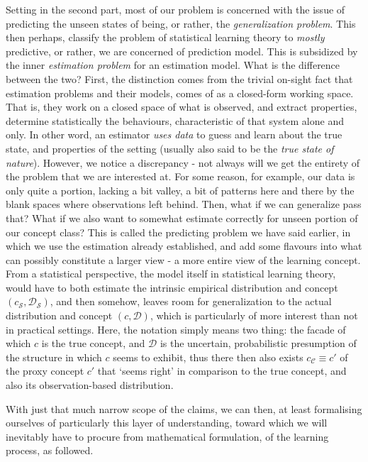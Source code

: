 Setting in the second part, most of our problem is concerned with the issue of predicting the unseen states of being, or rather, the \textit{generalization problem}. This then perhaps, classify the problem of statistical learning theory to \textit{mostly} predictive, or rather, we are concerned of prediction model. This is subsidized by the inner \textit{estimation problem} for an estimation model. What is the difference between the two? First, the distinction comes from the trivial on-sight fact that estimation problems and their models, comes of as a closed-form working space. That is, they work on a closed space of what is observed, and extract properties, determine statistically the behaviours, characteristic of that system alone and only. In other word, an estimator \textit{uses data} to guess and learn about the true state, and properties of the setting (usually also said to be the \textit{true state of nature}). However, we notice a discrepancy - not always will we get the entirety of the problem that we are interested at. For some reason, for example, our data is only quite a portion, lacking a bit valley, a bit of patterns here and there by the blank spaces where observations left behind. Then, what if we can generalize pass that? What if we also want to somewhat estimate correctly for unseen portion of our concept class? This is called the predicting problem we have said earlier, in which we use the estimation already established, and add some flavours into what can possibly constitute a larger view - a more entire view of the learning concept. From a statistical perspective, the model itself in statistical learning theory, would have to both estimate the intrinsic empirical distribution and concept $(c_{\mathcal{S}},\mathcal{D}_{\mathcal{S}})$, and then somehow, leaves room for generalization to the actual distribution and concept $(c,\mathcal{D})$, which is particularly of more interest than not in practical settings. Here, the notation simply means two thing: the facade of which $c$ is the true concept, and $\mathcal{D}$ is the uncertain, probabilistic presumption of the structure in which $c$ seems to exhibit, thus there then also exists $c_{\mathcal{C}}\equiv c'$ of the proxy concept $c'$ that `seems right' in comparison to the true concept, and also its observation-based distribution. 

With just that much narrow scope of the claims, we can then, at least formalising ourselves of particularly this layer of understanding, toward which we will inevitably have to procure from mathematical formulation, of the learning process, as followed. 

